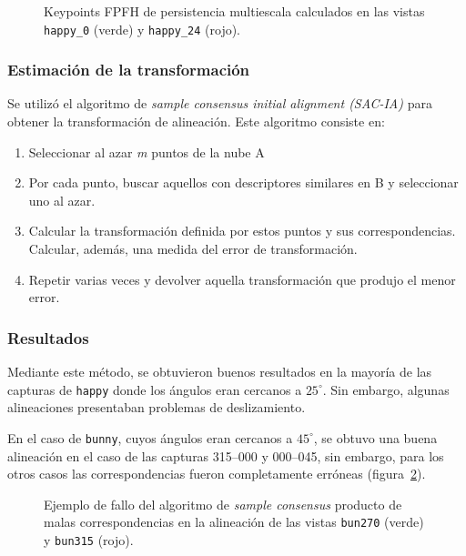 			\begin{figure}
				\caption{\label{fig:multiscale_key}Keypoints FPFH de persistencia multiescala calculados en las vistas \texttt{happy\_0} (verde) y \texttt{happy\_24} (rojo).}
			\end{figure}




		\subsubsection{Estimación de la transformación}
			Se utilizó el algoritmo de \emph{sample consensus initial alignment
			(SAC-IA)} para obtener la transformación de alineación. Este algoritmo
			consiste en: 
			\begin{enumerate}
				\item Seleccionar al azar \emph{m} puntos de la nube A
				\item Por cada punto, buscar aquellos con descriptores similares en B y seleccionar uno al azar.
				\item Calcular la transformación definida por estos puntos y
					sus correspondencias. Calcular, además, una medida del
					error de transformación.
				\item Repetir varias veces y devolver aquella transformación que produjo el menor error.
			\end{enumerate}

		\subsubsection{Resultados} %
			Mediante este método, se obtuvieron buenos resultados en la mayoría de las
			capturas de \texttt{happy}
			donde los ángulos eran cercanos a $25^{\circ}$.
			Sin embargo, algunas alineaciones presentaban problemas de deslizamiento. 

			En el caso de \texttt{bunny}, cuyos ángulos eran cercanos a $45^{\circ}$,
			se obtuvo una buena alineación en el caso de las capturas 315--000 y 000--045,
			sin embargo, para los otros casos las correspondencias fueron completamente erróneas (figura~\ref{fig:align_sac}).

			\begin{figure}
				\caption{\label{fig:align_sac}Ejemplo de fallo del algoritmo de \emph{sample consensus} producto de malas correspondencias
				en la alineación de las vistas
				\texttt{bun270} (verde) y \texttt{bun315} (rojo).}
			\end{figure}



